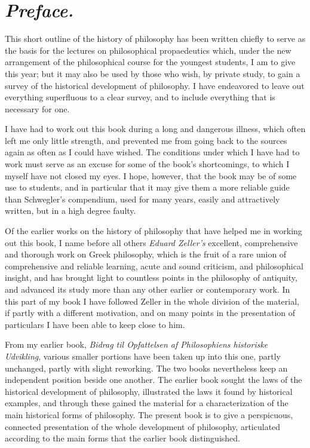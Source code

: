\chapter*{\emph{Preface.}}

\divrule

This short outline of the history of philosophy has been written
chiefly to serve as the basis for the lectures on philosophical
propaedeutics which, under the new arrangement of the philosophical
course for the youngest students, I am to give this year; but it may
also be used by those who wish, by private study, to gain a survey of
the historical development of philosophy. I have endeavored to leave
out everything superfluous to a clear survey, and to include everything
that is necessary for one.

I have had to work out this book during a long and dangerous illness,
which often left me only little strength, and prevented me from going
back to the sources again as often as I could have wished. The
conditions under which I have had to work must serve as an excuse for
some of the book's shortcomings, to which I myself have not closed my
eyes. I hope, however, that the book may be of some use to students,
and in particular that it may give them a more reliable guide than
Schwegler's compendium, used for many years, easily and attractively
written, but in a high degree faulty.

Of the earlier works on the history of philosophy that have helped me
in working out this book, I name before all others \emph{Eduard
Zeller's} excellent, comprehensive and thorough work on Greek
philosophy, which is the fruit of a rare union of comprehensive and
reliable learning, acute and sound criticism, and philosophical insight,
and has brought light to countless points in the philosophy of
antiquity, and advanced its study more than any other earlier or
contemporary work. In this part of my book I have followed Zeller in the
whole division of the material, if partly with a different motivation,
and on many points in the presentation of particulars I have been able
to keep close to him.

From my earlier book, \emph{Bidrag til Opfattelsen af Philosophiens
historiske Udvikling}, various smaller portions have been taken up into
this one, partly unchanged, partly with slight reworking. The two books
nevertheless keep an independent position beside one another. The
earlier book sought the laws of the historical development of
philosophy, illustrated the laws it found by historical examples, and
through these gained the material for a characterization of the main
historical forms of philosophy. The present book is to give a
perspicuous, connected presentation of the whole development of
philosophy, articulated according to the main forms that the earlier
book distinguished.


